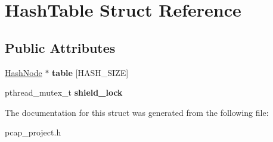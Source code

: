 \hypertarget{structHashTable}{}\section{Hash\+Table Struct Reference}
\label{structHashTable}
\subsection*{Public Attributes}
\begin{DoxyCompactItemize}
\item 
\mbox{\label{structHashTable_ace79f8473e5c5f91faf0fd5008625233}} 
\mbox{\hyperlink{structHashNode}{Hash\+Node}} $\ast$ {\bfseries table} \mbox{[}H\+A\+S\+H\+\_\+\+S\+I\+ZE\mbox{]}
\item 
\mbox{\label{structHashTable_a914bbd1a158b26af844f1d67e36f332d}} 
pthread\+\_\+mutex\+\_\+t {\bfseries shield\+\_\+lock}
\end{DoxyCompactItemize}


The documentation for this struct was generated from the following file\+:\begin{DoxyCompactItemize}
\item 
pcap\+\_\+project.\+h\end{DoxyCompactItemize}
